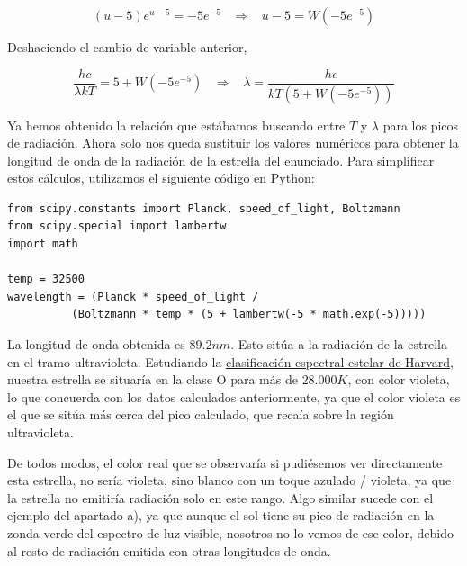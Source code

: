 \begin{enumerate}
    \begin{equation*}
        (u-5)e^{u-5} = -5e^{-5} \hspace{10pt} \Rightarrow \hspace{10pt} u-5 = W(-5e^{-5})
     \end{equation*}

    Deshaciendo el cambio de variable anterior,

    \begin{equation*}
    \frac{hc}{\lambda k T} = 5 + W(-5e^{-5}) \hspace{10pt} \Rightarrow \hspace{10pt}  \lambda = \frac{hc}{kT(5 + W(-5e^{-5}))}
    \end{equation*}

    Ya hemos obtenido la relación que estábamos buscando entre $T$ y $\lambda$ para los picos de radiación. Ahora solo
    nos queda sustituir los valores numéricos para obtener la longitud de onda de la radiación de la estrella del enunciado.
    Para simplificar estos cálculos, utilizamos el siguiente código en Python:\\

    \begin{verbatim}
from scipy.constants import Planck, speed_of_light, Boltzmann
from scipy.special import lambertw
import math

temp = 32500
wavelength = (Planck * speed_of_light /
          (Boltzmann * temp * (5 + lambertw(-5 * math.exp(-5)))))

    \end{verbatim}

    La longitud de onda obtenida es $89.2nm$. Esto sitúa a la radiación de la estrella en el tramo ultravioleta.
    Estudiando la \href{https://astronomy.swin.edu.au/cosmos/H/Harvard+spectral+classification}{clasificación espectral estelar de Harvard},
    nuestra estrella se situaría en la clase O para más de $28.000K$, con color violeta, lo que concuerda con los datos calculados
    anteriormente, ya que el color violeta
    es el que se sitúa más cerca del pico calculado, que recaía sobre la región ultravioleta.

    De todos modos, el color real que se observaría si pudiésemos ver directamente esta estrella, no sería violeta, sino blanco con
    un toque azulado / violeta, ya que la estrella no emitiría radiación solo en este rango. Algo similar sucede
    con el ejemplo del apartado a), ya que aunque el sol tiene su pico de radiación en la zonda verde del espectro de luz visible,
    nosotros no lo vemos de ese color, debido al resto de radiación emitida con otras longitudes de onda.




\end{enumerate}


